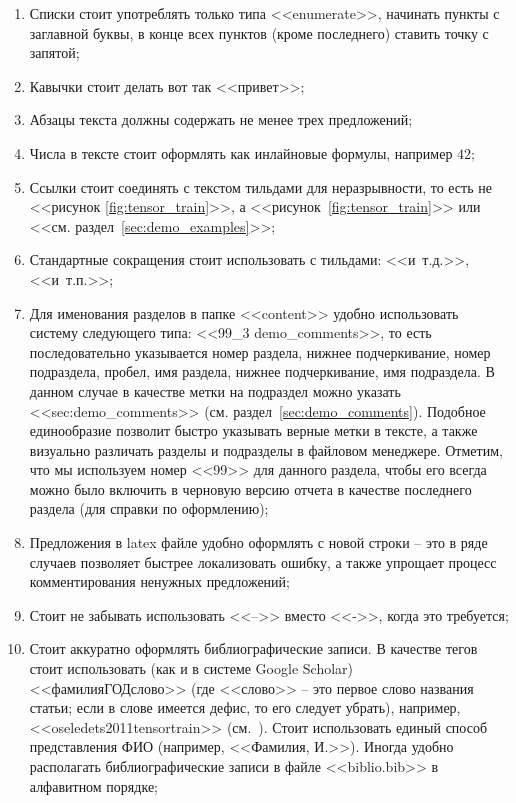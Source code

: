 \begin{enumerate}
  \item
    Списки стоит употреблять только типа <<enumerate>>, начинать пункты с заглавной буквы, в конце всех пунктов (кроме последнего) ставить точку с запятой;
  \item
    Кавычки стоит делать вот так <<привет>>;
  \item
    Абзацы текста должны содержать не менее трех предложений;
  \item
    Числа в тексте стоит оформлять как инлайновые формулы, например $42$;
  \item
    Ссылки стоит соединять с текстом тильдами для неразрывности, то есть не <<рисунок \ref{fig:tensor_train}>>, а <<рисунок~\ref{fig:tensor_train}>> или <<см. раздел~\ref{sec:demo_examples}>>;
  \item
    Стандартные сокращения стоит использовать с тильдами: <<и~т.д.>>, <<и~т.п.>>;
  \item
    Для именования разделов в папке <<content>> удобно использовать систему следующего типа: <<99\_3 demo\_comments>>, то есть последовательно указывается номер раздела, нижнее подчеркивание, номер подраздела, пробел, имя раздела, нижнее подчеркивание, имя подраздела.
    В данном случае в качестве метки на подраздел можно указать <<sec:demo\_comments>> (см. раздел~\ref{sec:demo_comments}).
    Подобное единообразие позволит быстро указывать верные метки в тексте, а также визуально различать разделы и подразделы в файловом менеджере.
    Отметим, что мы используем номер <<99>> для данного раздела, чтобы его всегда можно было включить в черновую версию отчета в качестве последнего раздела (для справки по оформлению);
  \item
    Предложения в latex файле удобно оформлять с новой строки -- это в ряде случаев позволяет быстрее локализовать ошибку, а также упрощает процесс комментирования ненужных предложений;
  \item
    Стоит не забывать использовать <<-->> вместо <<->>, когда это требуется;
  \item
    Стоит аккуратно оформлять библиографические записи. В качестве тегов стоит использовать (как и в системе Google Scholar) <<фамилияГОДслово>> (где <<слово>> -- это первое слово названия статьи; если в слове имеется дефис, то его следует убрать), например, <<oseledets2011tensortrain>> (см.~\cite{oseledets2011tensortrain}).
    Стоит использовать единый способ представления ФИО (например, <<Фамилия, И.>>).
    Иногда удобно располагать библиографические записи в файле <<biblio.bib>> в алфавитном порядке;

\end{enumerate}
